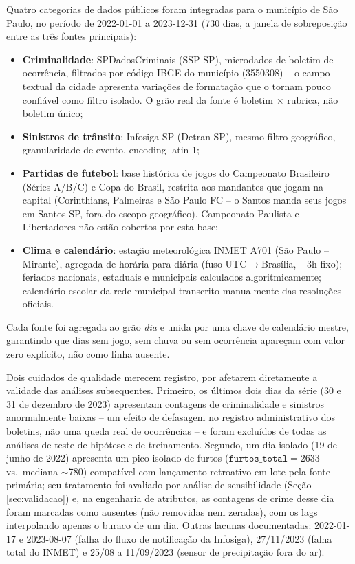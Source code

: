 \documentclass[12pt]{article}
\begin{document}
Quatro categorias de dados públicos foram integradas para o município de
São Paulo, no período de 2022-01-01 a 2023-12-31 (730 dias, a janela de
sobreposição entre as três fontes principais):

\begin{itemize}
  \item \textbf{Criminalidade}: SPDadosCriminais (SSP-SP), microdados de
  boletim de ocorrência, filtrados por código IBGE do município
  (3550308) -- o campo textual da cidade apresenta variações de
  formatação que o tornam pouco confiável como filtro isolado. O grão
  real da fonte é boletim $\times$ rubrica, não boletim único;
  \item \textbf{Sinistros de trânsito}: Infosiga SP (Detran-SP), mesmo
  filtro geográfico, granularidade de evento, encoding latin-1;
  \item \textbf{Partidas de futebol}: base histórica de jogos do
  Campeonato Brasileiro (Séries A/B/C) e Copa do Brasil, restrita aos
  mandantes que jogam na capital (Corinthians, Palmeiras e São Paulo FC
  -- o Santos manda seus jogos em Santos-SP, fora do escopo geográfico).
  Campeonato Paulista e Libertadores não estão cobertos por esta base;
  \item \textbf{Clima e calendário}: estação meteorológica INMET A701
  (São Paulo -- Mirante), agregada de horária para diária (fuso
  UTC$\to$Brasília, $-3$h fixo); feriados nacionais, estaduais e
  municipais calculados algoritmicamente; calendário escolar da rede
  municipal transcrito manualmente das resoluções oficiais.
\end{itemize}

Cada fonte foi agregada ao grão \emph{dia} e unida por uma chave de
calendário mestre, garantindo que dias sem jogo, sem chuva ou sem
ocorrência apareçam com valor zero explícito, não como linha ausente.

Dois cuidados de qualidade merecem registro, por afetarem diretamente a
validade das análises subsequentes. Primeiro, os últimos dois dias da
série (30 e 31 de dezembro de 2023) apresentam contagens de criminalidade
e sinistros anormalmente baixas -- um efeito de defasagem no registro
administrativo dos boletins, não uma queda real de ocorrências -- e foram
excluídos de todas as análises de teste de hipótese e de treinamento.
Segundo, um dia isolado (19 de junho de 2022) apresenta um pico isolado
de furtos ($\texttt{furtos\_total}=2633$ vs.\ mediana $\sim$780)
compatível com lançamento retroativo em lote pela fonte primária; seu
tratamento foi avaliado por análise de sensibilidade (Seção
\ref{sec:validacao}) e, na engenharia de atributos, as contagens de crime
desse dia foram marcadas como ausentes (não removidas nem zeradas), com
os lags interpolando apenas o buraco de um dia. Outras lacunas
documentadas: 2022-01-17 e 2023-08-07 (falha do fluxo de notificação da
Infosiga), 27/11/2023 (falha total do INMET) e 25/08 a 11/09/2023
(sensor de precipitação fora do ar).
\end{document}

